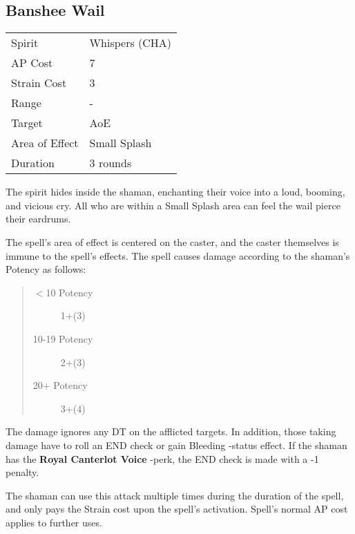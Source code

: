 \documentclass[11pt,a4paper,twocolumn]{book}
\begin{document}
\medskip

\subsection*{Banshee Wail}
{
	\begin{tabu} to 70mm{| X[l,4] | X[l,7] |}
		\hline
		Spirit         & Whispers (CHA) \\
		AP Cost        & 7               \\
		Strain Cost    & 3               \\
		Range          & -               \\
		Target         & AoE               \\
		Area of Effect & Small Splash               \\
		Duration       & 3 rounds               \\ \hline
	\end{tabu}
	
}
\medskip

The spirit hides inside the shaman, enchanting their voice into a loud, booming, and vicious cry. All who are within a Small Splash area can feel the wail pierce their eardrums.

The spell's area of effect is centered on the caster, and the caster themselves is immune to the spell's effects. The spell causes damage according to the shaman's Potency as follows:

\begin{quote}
	\begin{description}
		\item[$<$10 Potency] 	1+(3)
		\item[10-19 Potency] 	2+(3)
		\item[20+ Potency] 	3+(4)
	\end{description}
\end{quote}

The damage ignores any DT on the afflicted targets. In addition, those taking damage have to roll an END check or gain Bleeding -status effect. If the shaman has the \textbf{Royal Canterlot Voice} -perk, the END check is made with a -1 penalty.

The shaman can use this attack multiple times during the duration of the spell, and only pays the Strain cost upon the spell's activation. Spell's normal AP cost applies to further uses.
\end{document}
